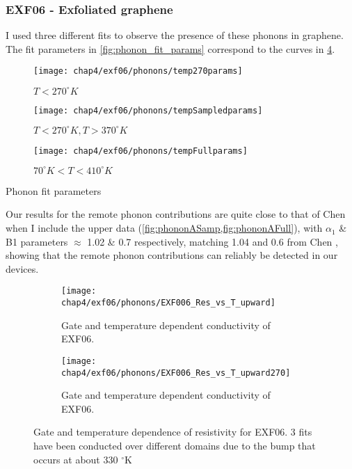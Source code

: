 \documentclass[../Matt_Gebert_Honours_Thesis.tex]{subfiles}
\begin{document}
\subsubsection{EXF06 - Exfoliated graphene}
I used three different fits to observe the presence of these phonons in graphene. 
The fit parameters in \cref{fig:phonon_fit_params} correspond to the curves in \cref{fig:exf_temp_gate}.
\begin{table}[H]
	\begin{subfigure}[b]{0.3\textwidth}
		\texttt{[image: chap4/exf06/phonons/temp270params]}
		\caption{$T < 270 ^\circ K$}\label{fig:phononA270}
	\end{subfigure}\hspace{0.03\textwidth}
	\begin{subfigure}[b]{0.3\textwidth}
		\texttt{[image: chap4/exf06/phonons/tempSampledparams]}
		\caption{$T < 270 ^\circ K, T > 370 ^\circ K$}\label{fig:phononASamp}
	\end{subfigure}\hspace{0.03\textwidth}
	\begin{subfigure}[b]{0.3\textwidth}
		\texttt{[image: chap4/exf06/phonons/tempFullparams]}
		\caption{$70 ^\circ K < T < 410 ^\circ K$}\label{fig:phononAFull}
	\end{subfigure}
	\caption{Phonon fit parameters}\label{fig:phonon_fit_params}
\end{table}

Our results for the remote phonon contributions are quite close to that of Chen \cite{chen_intrinsic_2008} when I include the upper data (\cref{fig:phononASamp,fig:phononAFull}), with $\alpha_1$ \& B1 parameters $\approx$ 1.02 \& 0.7 respectively, matching 1.04 and 0.6 from Chen  \cite{chen_intrinsic_2008}, showing that the remote phonon contributions can reliably be detected in our devices.

\begin{figure}[H]
	\begin{subfigure}[b]{0.45\textwidth}
		\centering
		\texttt{[image: chap4/exf06/phonons/EXF006\_Res\_vs\_T\_upward]}
		\caption[EXF06 temperature dependent conductivity]{Gate and temperature dependent conductivity of EXF06.}\label{fig:exf_temp_gate}
	\end{subfigure}\hspace{0.05\textwidth}
	\begin{subfigure}[b]{0.45\textwidth}
		\centering
		\texttt{[image: chap4/exf06/phonons/EXF006\_Res\_vs\_T\_upward270]}
		\caption[EXF06 temperature dependent conductivity]{Gate and temperature dependent conductivity of EXF06.}\label{fig:exf_temp_gate_zoom}
	\end{subfigure}
	\caption[Gate and temperature dependence of resistivity for EXF06]{Gate and temperature dependence of resistivity for EXF06. 3 fits have been conducted over different domains due to the bump that occurs at about 330 $^\circ$K}
\end{figure}
\end{document}
